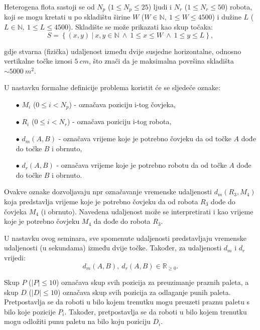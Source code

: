 \documentclass[times, utf8, seminar]{fer}
\begin{document}
Heterogena flota sastoji se od $N_p$ ($1 \le N_p \le 25$) ljudi i
 $N_r$ ($1 \le N_r \le 50$) robota,
koji se mogu kretati u po skladištu širine $W$ ($W \in \mathbb{N},\ 1 \le W \le 4500$)
i  dužine $L$ ($L \in \mathbb{N},\ 1 \le L \le 4500$).
Skladište se može prikazati kao skup točaka:
\begin{equation}
S = \left\{(x, y)\ |\ x, y \in \mathbb{N}\ \land\ 1 \le x \le W\ \land\ 1 \le y \le L\right\},
\end{equation}

gdje stvarna (fizička) udaljenost između dvije susjedne horizontalne, odnosno vertikalne točke 
iznosi $5\ cm$, što znači da je maksimalna površina skladišta
$\sim5000\ m^2$.

U nastavku formalne definicije problema koristit će se sljedeće oznake:
\begin{itemize}
    \item[$\bullet$] $M_i$ ($0 \le i < N_p$) - označava poziciju i-tog čovjeka,
    \item[$\bullet$] $R_i$ ($0 \le i < N_r$) - označava poziciju i-tog robota,
    \item[$\bullet$] $d_m(A, B)$ - označava vrijeme koje je potrebno čovjeku da od točke $A$ dođe do točke $B$ i obrnuto,
    \item[$\bullet$] $d_r(A, B)$ - označava vrijeme koje je potrebno robotu da od točke $A$ dođe do točke $B$ i obrnuto.
\end{itemize}

Ovakve oznake dozvoljavaju npr označavanje vremenske udaljenosti $d_m(R_3, M_4)$ koja
predstavlja vrijeme koje je potrebno čovjeku da od robota $R_3$ dođe do čovjeka
$M_4$ (i obrnuto). Navedena udaljenost može se interpretirati i kao vrijeme koje
je potrebno čovjeku $M_4$ da dođe do robota $R_3$.

U nastavku ovog seminara, sve spomenute udaljenosti predstavljaju vremenske udaljenosti (u sekundama) između
dvije točke. Također, za udaljenosti $d_m$ i $d_r$ vrijedi:
\begin{equation}
d_m(A, B),\ d_r(A, B) \in \mathbb{R}_{\ge0}.
\end{equation}

Skup $P$ ($|P| \le 10$) označava skup svih pozicija za preuzimanje praznih paleta,
a skup $D$ ($|D| \le 10$) označava skup svih pozicija za odlaganje punih paleta. Pretpostavlja
se da roboti u bilo kojem trenutku mogu preuzeti praznu paletu s bilo koje pozicije $P_i$.
Također, pretpostavlja se da roboti u bilo kojem trenutku mogu odložiti punu paletu na bilo
koju poziciju $D_i$.
\end{document}
